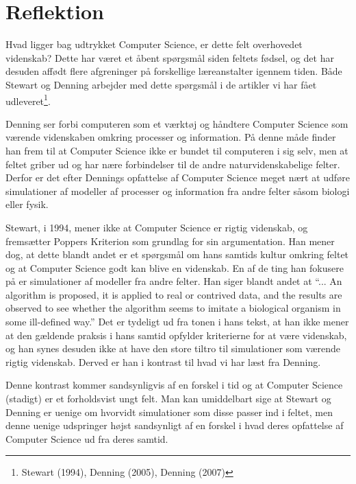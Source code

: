 \section{Reflektion}
Hvad ligger bag udtrykket Computer Science, er dette felt overhovedet videnskab?
Dette har været et åbent spørgsmål siden feltets fødsel, og det har desuden
affødt flere afgreninger på forskellige læreanstalter igennem tiden. Både Stewart og
Denning arbejder med dette spørgsmål i de artikler vi har fået udleveret\footnote{Stewart (1994), Denning (2005), Denning (2007)}.

Denning ser forbi computeren som et værktøj og håndtere Computer Science som værende videnskaben omkring processer og
information. På denne måde finder han frem til at Computer Science ikke er bundet til computeren i sig selv, men at
feltet griber ud og har nære forbindelser til de andre naturvidenskabelige felter. Derfor er det efter Dennings opfattelse af
Computer Science meget nært at udføre simulationer af modeller af processer og information fra andre felter såsom biologi
eller fysik.

Stewart, i 1994, mener ikke at Computer Science er rigtig videnskab, og fremsætter Poppers Kriterion som grundlag for sin
argumentation. Han mener dog, at dette blandt andet er et spørgsmål om hans samtids kultur omkring feltet og at
Computer Science godt kan blive en videnskab. En af de ting han fokusere på er simulationer af modeller fra andre
felter. Han siger blandt andet at ``... An algorithm is proposed, it is applied to real or contrived data, and the results are
observed to see whether the algorithm seems to imitate a biological organism in some ill-defined way.''
Det er tydeligt ud fra tonen i hans tekst, at han ikke mener at den gældende praksis i hans samtid opfylder kriterierne for
at være videnskab, og han synes desuden ikke at have den store tiltro til simulationer som værende rigtig videnskab. Derved
er han i kontrast til hvad vi har læst fra Denning.

Denne kontrast kommer sandsynligvis af en forskel i tid og at Computer Science (stadigt) er et forholdsvist ungt felt.
Man kan umiddelbart sige at Stewart og Denning er uenige om hvorvidt simulationer som disse passer ind i feltet, men
denne uenige udspringer højst sandsynligt af en forskel i hvad deres opfattelse af Computer Science ud fra deres samtid.
